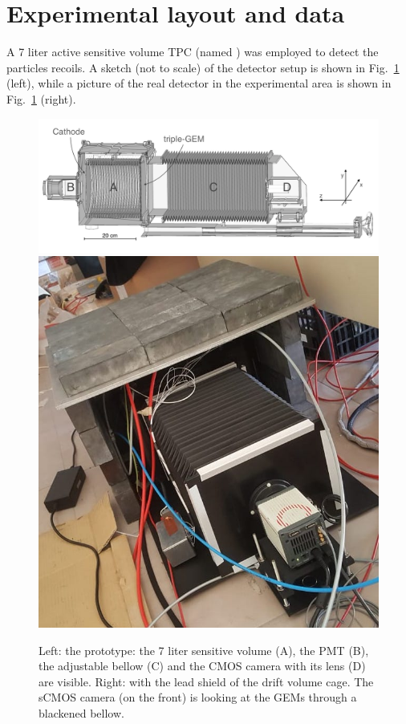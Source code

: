 \documentclass[12pt]{iopart}
\begin{document}
\section{Experimental layout and data }
\label{sec:layout}
A 7 liter active sensitive volume TPC (named \lemon \cite{paperBTF})
was employed to detect the particles recoils. A sketch (not to scale)
of the detector setup is shown in Fig.~\ref{fig:lemon} (left), while a picture
of the real detector in the experimental area is shown in Fig.~\ref{fig:lemon} (right).
% 
\begin{figure}[ht]
	\centering
	\includegraphics[width=0.70\linewidth]{figures/lemon.png}
        \includegraphics[width=0.20\linewidth]{LEMON-Shielded.jpg}
  	\caption{Left: the \lemon prototype: the 7 liter sensitive
          volume (A), the PMT (B), the adjustable bellow (C) and the
          CMOS camera with its lens (D) are visible. Right: \lemon
          with the lead shield of the drift volume cage. The sCMOS
          camera (on the front) is looking at the GEMs through a
          blackened bellow.
  	\label{fig:lemon}}
\end{figure}
 
\end{document}

